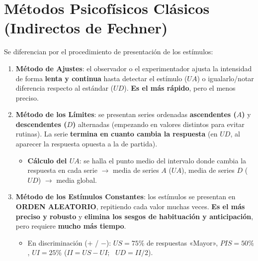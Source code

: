 \documentclass[11pt,a4paper]{article}
\begin{document}
\section{Métodos Psicofísicos Clásicos (Indirectos de Fechner)}

Se diferencian por el procedimiento de presentación de los estímulos:

\begin{enumerate}
  \item \textbf{Método de Ajustes}: el observador o el experimentador ajusta la intensidad de forma \textbf{lenta y continua} hasta detectar el estímulo ($UA$) o igualarlo/notar diferencia respecto al estándar ($UD$). \textbf{Es el más rápido}, pero el menos preciso.
  \item \textbf{Método de los Límites}: se presentan series ordenadas \textbf{ascendentes ($A$)} y \textbf{descendentes ($D$)} alternadas (empezando en valores distintos para evitar rutinas). La serie \textbf{termina en cuanto cambia la respuesta} (en $UD$, al aparecer la respuesta opuesta a la de partida).
  \begin{itemize}
    \item \textbf{Cálculo del $UA$}: se halla el punto medio del intervalo donde cambia la respuesta en cada serie $\to$ media de series $A$ ($UA$), media de series $D$ ($UD$) $\to$ media global.
  \end{itemize}
  \item \textbf{Método de los Estímulos Constantes}: los estímulos se presentan en \textbf{ORDEN ALEATORIO}, repitiendo cada valor muchas veces. \textbf{Es el más preciso y robusto} y \textbf{elimina los sesgos de habituación y anticipación}, pero requiere \textbf{mucho más tiempo}.
  \begin{itemize}
    \item En discriminación ($+$ / $-$): \textbf{$US = 75\%$} de respuestas «Mayor», \textbf{$PIS = 50\%$}, \textbf{$UI = 25\%$} \quad ($II = US - UI$; \ $UD = II/2$).
  \end{itemize}
\end{enumerate}
\end{document}
